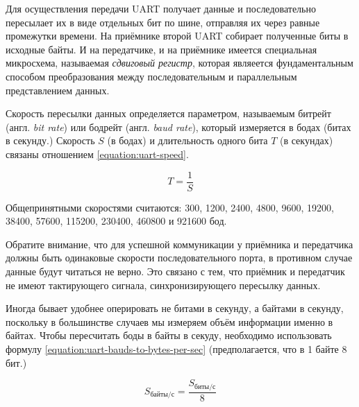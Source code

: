 \documentclass[../sparc.tex]{subfiles}
\begin{document}
Для осуществления передачи UART получает данные и последовательно пересылает их
в виде отдельных бит по шине, отправляя их через равные промежутки времени.  На
приёмнике второй UART собирает полученные биты в исходные байты.  И на
передатчике, и на приёмнике имеется специальная микросхема, называемая
\emph{сдвиговый регистр}, которая являеется фундаментальным способом
преобразования между последовательным и параллельным представлением данных.

Скорость пересылки данных определяется параметром, называемым битрейт
(англ. \emph{bit rate}) или бодрейт (англ. \emph{baud rate}), который измеряется
в бодах (битах в секунду.)  Скорость $S$ (в бодах) и длительность одного бита
$T$ (в секундах) связаны отношением \ref{equation:uart-speed}.

\begin{equation}
  T = \frac{1}{S}
  \label{equation:uart-speed}
\end{equation}

Общепринятными скоростями считаются: 300, 1200, 2400, 4800, 9600, 19200, 38400,
57600, 115200, 230400, 460800 и 921600 бод.


Обратите внимание, что для успешной коммуникации у приёмника и передатчика
должны быть одинаковые скорости последовательного порта, в противном случае
данные будут читаться не верно.  Это связано с тем, что приёмник и передатчик не
имеют тактирующего сигнала, синхронизирующего пересылку данных.

Иногда бывает удобнее оперировать не битами в секунду, а байтами в секунду,
поскольку в большинстве случаев мы измеряем объём информации именно в байтах.
Чтобы пересчитать боды в байты в секуду, необходимо использовать формулу
\ref{equation:uart-bauds-to-bytes-per-sec} (предполагается, что в 1 байте 8
бит.)

\begin{equation}
  S_{\mbox{байты/с}} = \frac{S_{\mbox{биты/с}}}{8}
  \label{equation:uart-bauds-to-bytes-per-sec}
\end{equation}
\end{document}

